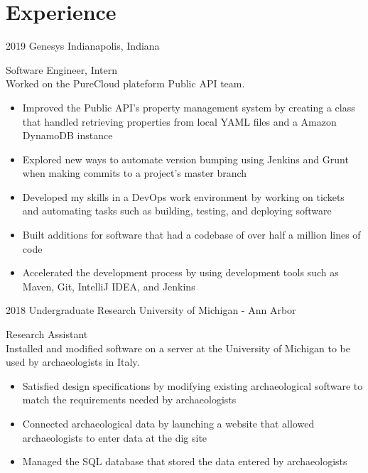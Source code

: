 \documentclass[]{cv-style}
\begin{document}
\section{Experience}
\begin{entrylist}
\entry
{2019}
{Genesys}
{Indianapolis, Indiana}
{Software Engineer, Intern\\
Worked on the PureCloud plateform Public API team.
\begin{itemize}
    \item Improved the Public API's property management system by creating a class that handled retrieving properties from local YAML files and a Amazon DynamoDB instance
    \item Explored new ways to automate version bumping using Jenkins and Grunt when making commits to a project's master branch
    \item Developed my skills in a DevOps work environment by working on tickets and automating tasks such as building, testing, and deploying software
    \item Built additions for software that had a codebase of over half a million lines of code
    \item Accelerated the development process by using development tools such as Maven, Git, IntelliJ IDEA, and Jenkins
\end{itemize}}
\entry
{2018}
{Undergraduate Research}
{University of Michigan - Ann Arbor}
{Research Assistant\\
Installed and modified software on a server at the University of Michigan to be used by archaeologists in Italy. 
\begin{itemize}
    \item Satisfied design specifications by modifying existing archaeological software to match the requirements needed by archaeologists
    \item Connected archaeological data by launching a website that allowed archaeologists to enter data at the dig site
    \item Managed the SQL database that stored the data entered by archaeologists
\end{itemize}}
\end{entrylist}
\end{document}
